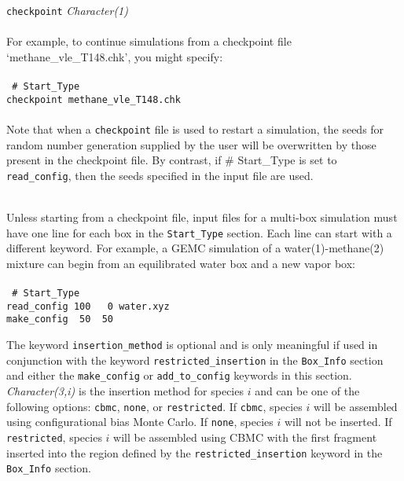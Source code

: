 \begin{itemize}
{\tt checkpoint} {\it Character(1)} \\ \\
%
For example, to continue simulations from a checkpoint file `methane\_vle\_T148.chk', you might specify: \\ \\
%
\texttt{
\# Start\_Type \\
checkpoint methane\_vle\_T148.chk \\ } \\
%
Note that when a {\tt checkpoint} file is used to restart a simulation, the seeds for random number generation supplied by the user
will be overwritten by those present in the checkpoint file. By contrast, if \# Start\_Type is set to {\tt read\_config}, 
then the seeds specified in the input file are used.  \\ \\
%
\end{itemize}
Unless starting from a checkpoint file, input files for a multi-box simulation must have one line for each box in the \texttt{Start\_Type} section. Each line can start with a different keyword. For example, a GEMC simulation of a water(1)-methane(2) mixture can begin from an equilibrated water box and a new vapor box: \\ \\
%
\texttt{
\# Start\_Type \\
read\_config 100 \ \ 0 water.xyz \\
make\_config \ 50 \ 50 \\}

The keyword {\tt insertion\_method} is optional and is only meaningful if used in conjunction
with the keyword {\tt restricted\_insertion} in the {\tt Box\_Info} section and
either the {\tt make\_config} or {\tt add\_to\_config} keywords in this section.
{\it Character(3,i)} is the insertion method for species $i$ and can be one of the following options:
{\tt cbmc}, {\tt none}, or {\tt restricted}.
If {\tt cbmc}, species $i$ will be assembled using configurational bias Monte Carlo.
If {\tt none}, species $i$ will not be inserted.
If \texttt{restricted}, species $i$ will be assembled using CBMC
with the first fragment inserted into the region defined by 
the \texttt{restricted\_insertion} keyword in the \texttt{Box\_Info} section. \\
%
%
%
